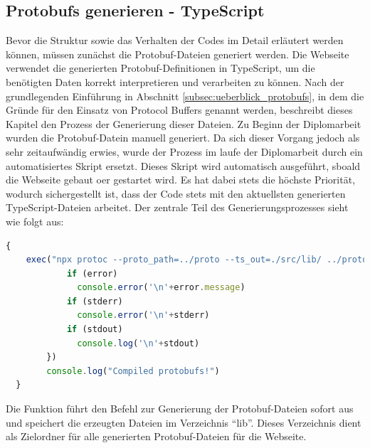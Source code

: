 \subsection{Protobufs generieren - TypeScript}
\label{subsec:proto_gen_TS}
Bevor die Struktur sowie das Verhalten der Codes im Detail erläutert werden können,
müssen zunächst die Protobuf-Dateien generiert werden. 
%
Die Webseite verwendet die generierten Protobuf-Definitionen in TypeScript, 
um die benötigten Daten korrekt interpretieren und verarbeiten zu können.
%
Nach der grundlegenden Einführung in Abschnitt \ref{subsec:ueberblick_protobufs}, 
in dem die Gründe für den Einsatz von Protocol Buffers genannt werden, 
beschreibt dieses Kapitel den Prozess der Generierung dieser Dateien.
%
Zu Beginn der Diplomarbeit wurden die Protobuf-Datein manuell generiert. 
Da sich dieser Vorgang jedoch als sehr zeitaufwändig erwies,
wurde der Prozess im laufe der Diplomarbeit durch ein automatisiertes Skript ersetzt.
%
Dieses Skript wird automatisch ausgeführt, sboald die Webseite gebaut oer gestartet wird.
Es hat dabei stets die höchste Priorität, wodurch sichergestellt ist, 
dass der Code stets mit den aktuellsten generierten TypeScript-Dateien arbeitet.
%
Der zentrale Teil des Generierungsprozesses sieht wie folgt aus:
\begin{lstlisting}[language=JavaScript, gobble=4]
  {
    exec("npx protoc --proto_path=../proto --ts_out=./src/lib/ ../proto/*.proto", (error, stdout, stderr) => {
            if (error)
              console.error('\n'+error.message)
            if (stderr)
              console.error('\n'+stderr)
            if (stdout)
              console.log('\n'+stdout)
        })
        console.log("Compiled protobufs!")
  }
\end{lstlisting}
Die Funktion führt den Befehl zur Generierung der Protobuf-Dateien sofort aus und speichert die erzeugten Dateien
im Verzeichnis ``lib''. 
Dieses Verzeichnis dient als Zielordner für alle generierten Protobuf-Dateien für die Webseite.

